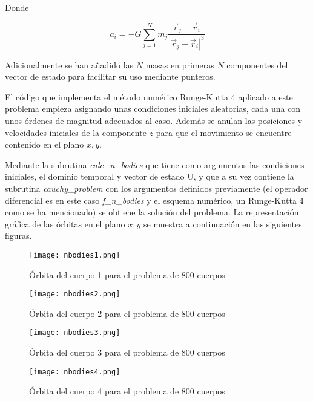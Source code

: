 \documentclass{article}
\begin{document}
	\begin{center}
		Donde
	\end{center}
	$$a_i=-G\sum_{j=1}^{N}m_j\frac{\vec{r}_j-\vec{r}_i}{|\vec{r}_j-\vec{r}_i|^3}$$
	
	Adicionalmente se han añadido las $N$ masas en primeras $N$ componentes del vector de estado para facilitar su uso mediante punteros.
	
	El código que implementa el método numérico Runge-Kutta 4 aplicado a este problema empieza asignando unas condiciones iniciales aleatorias, cada una con unos órdenes de magnitud adecuados al caso. Además se anulan las posiciones y velocidades iniciales de la componente $z$ para que el movimiento se encuentre contenido en el plano $x,y$.
	
	Mediante la subrutina \textit{calc\_n\_bodies} que tiene como argumentos las condiciones iniciales, el dominio temporal y vector de estado U, y que a su vez contiene la subrutina \textit{cauchy\_problem} con los argumentos definidos previamente (el operador diferencial es en este caso \textit{f\_n\_bodies} y el esquema numérico, un Runge-Kutta 4 como se ha mencionado) se obtiene la solución del problema. La representación gráfica de las órbitas en el plano $x,y$ se muestra a continuación en las siguientes figuras.
	
	\newpage
	
	\begin{figure}[h!]
		\begin{center}
			\texttt{[image: nbodies1.png]}
			\caption{Órbita del cuerpo 1 para el problema de 800 cuerpos}
		\end{center}
	\end{figure}

	\begin{figure}[h!]
		\begin{center}
			\texttt{[image: nbodies2.png]}
			\caption{Órbita del cuerpo 2 para el problema de 800 cuerpos}
		\end{center}
	\end{figure}

	\newpage

	\begin{figure}[h!]
		\begin{center}
			\texttt{[image: nbodies3.png]}
			\caption{Órbita del cuerpo 3 para el problema de 800 cuerpos}
		\end{center}
	\end{figure}

	\begin{figure}[h!]
		\begin{center}
			\texttt{[image: nbodies4.png]}
			\caption{Órbita del cuerpo 4 para el problema de 800 cuerpos}
		\end{center}
	\end{figure}
\end{document}
